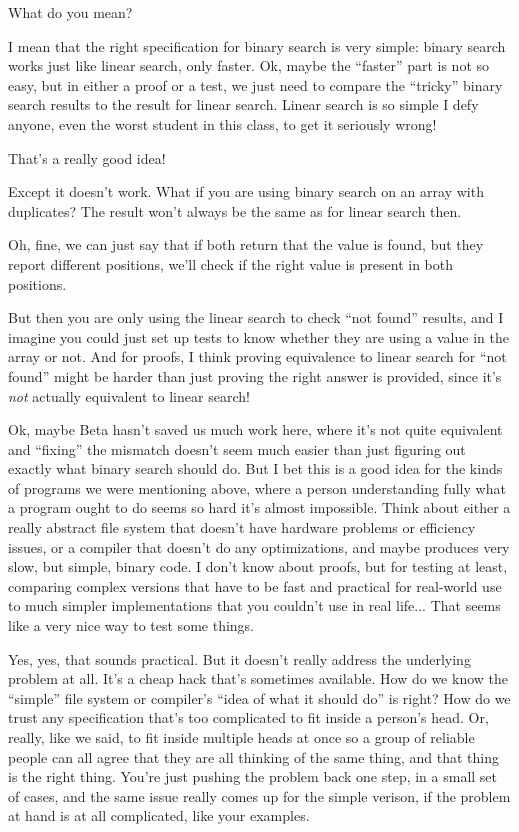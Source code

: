 \documentclass[sigplan]{acmart}
\begin{document}
 What do you mean?

 I mean that the right specification for
binary search is very simple:  binary search works just like linear
search, only faster.  Ok, maybe the ``faster'' part is not so easy,
but in either a proof or a test, we just need to compare the
``tricky'' binary search results to the result for linear search.
Linear search is so simple I defy anyone, even the worst student in
this class, to get it seriously wrong!

  That's a really good idea!

  Except it doesn't work.   What if you are
using binary search on an array with duplicates?  The result won't
always be the same as for linear search  then.

 Oh, fine, we can just say that if both
return that the value is found, but they report different positions,
we'll check if the right value is present in both
positions.

 But then you are only using the linear
search to check ``not found'' results, and I imagine you could just
set up tests to know whether they are using a value in the array or
not.  And for proofs, I think proving equivalence to linear search for
``not found'' might be harder than just proving the right answer is
provided, since it's \emph{not} actually equivalent to linear search!

  Ok, maybe Beta hasn't saved us much
work here, where it's not quite equivalent and ``fixing'' the mismatch
doesn't seem much easier than just figuring out exactly what binary
search should do.  But I bet this is a good idea for the kinds of
programs we were mentioning above, where a person understanding fully
what a program ought to do seems so hard it's almost impossible.
Think about either a really abstract file system that doesn't have
hardware problems or efficiency issues, or a compiler that doesn't do
any optimizations, and maybe produces very slow, but simple, binary
code.  I don't know about proofs, but for testing at least, comparing
complex versions that have to be fast and practical for real-world use
to much simpler implementations that you couldn't use in real life...
That seems like a very nice way to test some things.

  Yes, yes, that sounds practical.  But it
doesn't really address the underlying problem at all.  It's a cheap
hack that's sometimes available. How do we know the ``simple''
file system or compiler's ``idea of what it should do'' is right?  How
do we trust any specification that's too complicated to fit inside a
person's head.  Or, really, like we said, to fit inside multiple heads
at once so a group of reliable people can all agree that they are all
thinking of the same thing, and that thing is the right thing.  You're
just pushing the problem back one step, in a small set of cases, and
the same issue really comes up for the simple verison, if the problem
at hand is at all complicated, like your examples.
\end{document}
